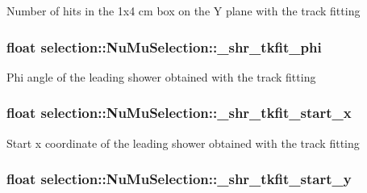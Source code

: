 Number of hits in the 1x4 cm box on the Y plane with the track fitting \hypertarget{classselection_1_1NuMuSelection_a82badfd521973f96eb8e2b04d2d768f1}{
\subsubsection[{\-\_\-shr\-\_\-tkfit\-\_\-phi}]{\setlength{\rightskip}{0pt plus 5cm}float selection\-::\-Nu\-Mu\-Selection\-::\-\_\-shr\-\_\-tkfit\-\_\-phi\hspace{0.3cm}{\ttfamily [private]}}}\label{classselection_1_1NuMuSelection_a82badfd521973f96eb8e2b04d2d768f1}
Phi angle of the leading shower obtained with the track fitting \hypertarget{classselection_1_1NuMuSelection_a2e7f6e41acd96cb4ff217b1ec129884e}{
\subsubsection[{\-\_\-shr\-\_\-tkfit\-\_\-start\-\_\-x}]{\setlength{\rightskip}{0pt plus 5cm}float selection\-::\-Nu\-Mu\-Selection\-::\-\_\-shr\-\_\-tkfit\-\_\-start\-\_\-x\hspace{0.3cm}{\ttfamily [private]}}}\label{classselection_1_1NuMuSelection_a2e7f6e41acd96cb4ff217b1ec129884e}
Start x coordinate of the leading shower obtained with the track fitting \hypertarget{classselection_1_1NuMuSelection_aced5ceef2d92e448cfed37ec3fb75ab4}{
\subsubsection[{\-\_\-shr\-\_\-tkfit\-\_\-start\-\_\-y}]{\setlength{\rightskip}{0pt plus 5cm}float selection\-::\-Nu\-Mu\-Selection\-::\-\_\-shr\-\_\-tkfit\-\_\-start\-\_\-y\hspace{0.3cm}{\ttfamily [private]}}}\label{classselection_1_1NuMuSelection_aced5ceef2d92e448cfed37ec3fb75ab4}

